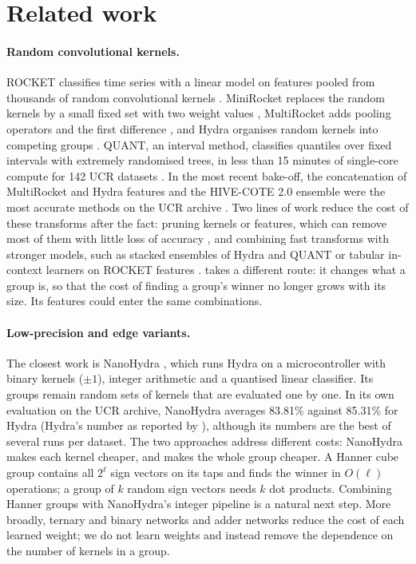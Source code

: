 \section{Related work}
\label{sec:related}

\paragraph{Random convolutional kernels.} ROCKET classifies time series with a linear
model on features pooled from thousands of random convolutional kernels
\citep{dempster2020rocket}. MiniRocket replaces the random kernels by a small fixed set with
two weight values \citep{dempster2021minirocket}, MultiRocket adds pooling operators and the
first difference \citep{tan2022multirocket}, and Hydra organises random kernels into
competing groups \citep{dempster2023hydra}. QUANT, an interval method, classifies quantiles
over fixed intervals with extremely randomised trees, in less than 15 minutes of
single-core compute for 142 UCR datasets \citep{dempster2024quant}. In the
most recent bake-off, the concatenation of MultiRocket and Hydra features and the HIVE-COTE
2.0 ensemble were the most accurate methods on the UCR archive
\citep{middlehurst2024bakeoff,middlehurst2021hc2}. Two lines of work reduce the cost of
these transforms after the fact: pruning kernels or features, which can remove most of them
with little loss of accuracy \citep{salehinejad2022srocket,uribarri2024detach}, and
combining fast transforms with stronger models, such as stacked ensembles of Hydra and
QUANT \citep{maniar2025metalearning} or tabular in-context learners on ROCKET features
\citep{orourke2026rocketpfn}. \hh{} takes a different route: it changes what a group is, so
that the cost of finding a group's winner no longer grows with its size. Its features could
enter the same combinations.

\paragraph{Low-precision and edge variants.} The closest work is NanoHydra
\citep{cioflan2025nanohydra}, which runs Hydra on a microcontroller with binary kernels
($\pm1$), integer arithmetic and a quantised linear classifier. Its groups remain random
sets of kernels that are evaluated one by one. In its own evaluation on the UCR archive,
NanoHydra averages 83.81\% against 85.31\% for Hydra (Hydra's number as reported by
\citet{schaefer2023weasel2}), although its numbers are the best of several runs per
dataset. The two approaches address different costs: NanoHydra makes each kernel cheaper,
and \hh{} makes the whole group cheaper. A Hanner cube group contains all $2^\ell$ sign
vectors on its taps and finds the winner in $O(\ell)$ operations; a group of $k$ random
sign vectors needs $k$ dot products. Combining Hanner groups with NanoHydra's integer
pipeline is a natural next step. More broadly, ternary and binary networks
\citep{li2016ternary,rastegari2016xnor} and adder networks \citep{chen2020addernet} reduce
the cost of each learned weight; we do not learn weights and instead remove the dependence
on the number of kernels in a group.

